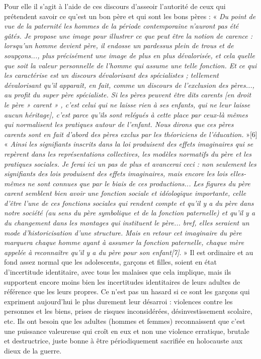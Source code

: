  Pour elle il s'agit à l'aide de ces discours d'asseoir l'autorité de ceux qui prétendent savoir ce qu'est un bon père et qui sont les bons pères : « \emph{Du point de vue de la paternité les hommes de la période contemporaine n'auront pas été gâtés. Je propose une image pour illustrer ce que peut être la notion de carence : lorsqu'un homme devient père, il endosse un pardessus plein de trous et de soupçons..., plus précisément une image de plus en plus dévalorisée, et cela quelle que soit la valeur personnelle de l'homme qui assume une telle fonction. Et ce qui les caractérise est un discours dévalorisant des spécialistes ; tellement dévalorisant qu'il apparaît, en fait, comme un discours de l'exclusion des pères..., au profit du super père spécialiste. Si les pères peuvent être dits carents [en droit le père » carent » , c'est celui qui ne laisse rien à ses enfants, qui ne leur laisse aucun héritage], c'est parce qu'ils sont relégués à cette place par ceux-là mêmes qui normalisent les pratiques autour de l'enfant. Nous dirons que ces pères carents sont en fait d'abord des pères exclus par les théoriciens de l'éducation.} »[6]
 « \emph{Ainsi les signifiants inscrits dans la loi produisent des effets imaginaires qui se repèrent dans les représentations collectives, les modèles normatifs du père et les pratiques sociales.} 
 \emph{Je ferai ici un pas de plus et avancerai ceci : non seulement les signifiants des lois produisent des effets imaginaires, mais encore les lois elles-mêmes ne sont connues que par le biais de ces productions...}
 \emph{Les figures du père carent semblent bien avoir une fonction sociale et idéologique importante, celle d'être l'une de ces fonctions sociales qui rendent compte et qu'il y a du père dans notre société (au sens du père symbolique et de la fonction paternelle) et qu'il y a du changement dans les montages qui instituent le père... bref, elles seraient un mode d'historicisation d'une structure.}
 \emph{Mais en retour cet imaginaire du père marquera chaque homme ayant à assumer la fonction paternelle, chaque mère appelée à reconnaître qu'il y a du père pour son enfant[7]}. » 
 Il est ordinaire et au fond assez normal que les adolescents, garçons et filles, soient en état d'incertitude identitaire, avec tous les malaises que cela implique, mais ils supportent encore moins bien les incertitudes identitaires de leurs adultes de référence que les leurs propres. Ce n'est pas un hasard si ce sont les garçons qui expriment aujourd'hui le plus durement leur désarroi : violences contre les personnes et les biens, prises de risques inconsidérées, désinvestissement scolaire, etc. Ils ont besoin que les adultes (hommes et femmes) reconnaissent que c'est une puissance valeureuse qui croît en eux et non une violence erratique, brutale et destructrice, juste bonne à être périodiquement sacrifiée en holocauste aux dieux de la guerre.

